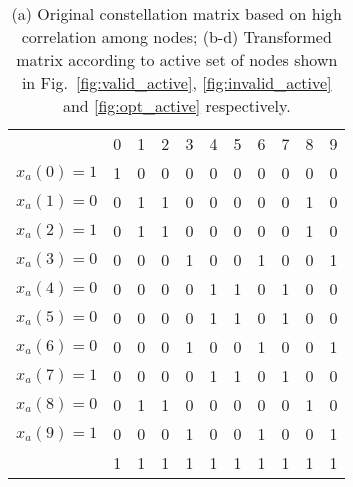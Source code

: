 \documentclass[conference]{IEEEtran}
\begin{document}
\begin{table*}
\begin{subtable}[b]{0.45\linewidth}
\begin{tabular}{c|c|c|c|c|c|c|c|c|c|c|}
	\multicolumn{1}{c}{}  &  \multicolumn{1}{c}{0} & \multicolumn{1}{c}{1} & 
	\multicolumn{1}{c}{2} &  \multicolumn{1}{c}{3} & \multicolumn{1}{c}{4} & 
	\multicolumn{1}{c}{5} &  \multicolumn{1}{c}{6} & \multicolumn{1}{c}{7} & 
	\multicolumn{1}{c}{8} &  \multicolumn{1}{c}{9} \\ \cline{2-11}
	{\color{red} $x_{a}(0)=1$} & {\color{red} 1} & {\color{red} 0} & {\color{red} 0} & {\color{red} 0} & {\color{red} 0} & {\color{red} 0} & {\color{red} 0} & {\color{red} 0} & {\color{red} 0} & {\color{red} 0} \\ \cline{2-11}
	$x_{a}(1)=0$ & 0 & 1 & 1 & 0 & 0 & 0 & 0 & 0 & 1 & 0 \\ \cline{2-11}
	{\color{red} $x_{a}(2)=1$} & {\color{red} 0} & {\color{red} 1} & {\color{red} 1} & {\color{red} 0} & {\color{red} 0} & {\color{red} 0} & {\color{red} 0} & {\color{red} 0} & {\color{red} 1} & {\color{red} 0} \\ \cline{2-11}
	$x_{a}(3)=0$ & 0 & 0 & 0 & 1 & 0 & 0 & 1 & 0 & 0 & 1 \\ \cline{2-11}
	$x_{a}(4)=0$ & 0 & 0 & 0 & 0 & 1 & 1 & 0 & 1 & 0 & 0 \\ \cline{2-11}
	$x_{a}(5)=0$ & 0 & 0 & 0 & 0 & 1 & 1 & 0 & 1 & 0 & 0 \\ \cline{2-11}
	$x_{a}(6)=0$ & 0 & 0 & 0 & 1 & 0 & 0 & 1 & 0 & 0 & 1 \\ \cline{2-11}
	{\color{red} $x_{a}(7)=1$} & {\color{red} 0} & {\color{red} 0} & {\color{red} 0} & {\color{red} 0} & {\color{red} 1} & {\color{red} 1} & {\color{red} 0} & {\color{red} 1} & {\color{red} 0} & {\color{red} 0} \\ \cline{2-11}
	$x_{a}(8)=0$ & 0 & 1 & 1 & 0 & 0 & 0 & 0 & 0 & 1 & 0 \\ \cline{2-11}
	{\color{red} $x_{a}(9)=1$} & {\color{red} 0} & {\color{red} 0} & {\color{red} 0} & {\color{red} 1} & {\color{red} 0} & {\color{red} 0} & {\color{red} 1} & {\color{red} 0} & {\color{red} 0} & {\color{red} 1} \\ \cline{2-11}
	\multicolumn{1}{c}{} & \multicolumn{1}{c}{{\color{blue}1}} & \multicolumn{1}{c}{{\color{blue}1}} & \multicolumn{1}{c}{{\color{blue}1}} & \multicolumn{1}{c}{{\color{blue}1}} & \multicolumn{1}{c}{{\color{blue}1}} & \multicolumn{1}{c}{{\color{blue}1}} & \multicolumn{1}{c}{{\color{blue}1}} & \multicolumn{1}{c}{{\color{blue}1}} & \multicolumn{1}{c}{{\color{blue}1}} & \multicolumn{1}{c}{{\color{blue}1}} \\
	\end{tabular}	
	\caption{}
	\label{table:mat4}
\end{subtable}
\caption{(a) Original constellation matrix based on high correlation among nodes; (b-d) Transformed matrix according to active set of nodes shown in Fig.~\ref{fig:valid_active}, \ref{fig:invalid_active} and \ref{fig:opt_active} respectively.}
\label{table:const_matrix}
\end{table*}
\end{document}
